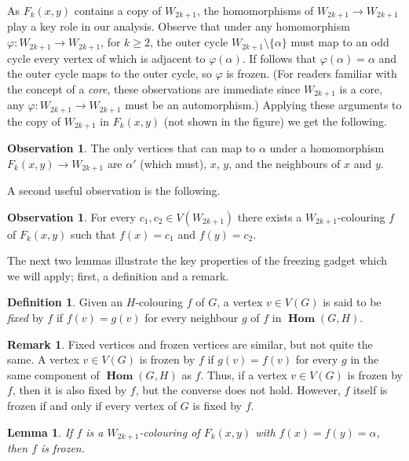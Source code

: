 \documentclass[11 pt]{amsart}
\newtheorem{lem}[equation]{Lemma}
\theoremstyle{definition}
\newtheorem{defn}[equation]{Definition}
\newtheorem{obs}[equation]{Observation}
\newtheorem{rem}[equation]{Remark}
\theoremstyle{case}
\numberwithin{equation}{section}
\newcommand{\bHom}{\operatorname{\mathbf{Hom}}}
\begin{document}
As $F_k(x,y)$ contains a copy of $W_{2k+1}$, the homomorphisms of $W_{2k+1} \to W_{2k+1}$ play a key role in our analysis.  Observe that under any homomorphism $\varphi: W_{2k+1} \to W_{2k+1}$, for $k \geq 2$, the outer cycle $W_{2k+1} \setminus \{ \alpha \}$ must map to an odd cycle every vertex of which is adjacent to $\varphi(\alpha)$.  If follows that $\varphi(\alpha) = \alpha$ and the outer cycle maps to the outer cycle, so $\varphi$ is frozen.  (For readers familiar with the concept of a \emph{core}, these observations are immediate since $W_{2k+1}$ is a core, any $\varphi: W_{2k+1} \to W_{2k+1}$ must be an automorphism.) Applying these arguments to the copy of $W_{2k+1}$ in $F_k(x,y)$ (not shown in the figure) we get the following.

\begin{obs}
\label{toalpha}
The only vertices that can map to $\alpha$ under a homomorphism $F_k(x,y) \to W_{2k+1}$ are $\alpha'$ (which must), $x$, $y$, and the neighbours of $x$ and $y$.  
\end{obs}

A second useful observation is the following.

\begin{obs}
\label{anyPair}
For every $c_1,c_2\in V(W_{2k+1})$ there exists a $W_{2k+1}$-colouring $f$ of $F_k(x,y)$ such that $f(x)=c_1$ and $f(y)=c_2$. 
\end{obs}

The next two lemmas illustrate the key properties of the freezing gadget which we will apply; first, a definition and a remark. 

\begin{defn}
Given an $H$-colouring $f$ of $G$, a vertex $v\in V(G)$ is said to be \emph{fixed} by $f$ if $f(v) = g(v)$ for every neighbour $g$ of $f$ in $\bHom(G,H)$.
\end{defn}

\begin{rem}
Fixed vertices and frozen vertices are similar, but not quite the same. A vertex $v \in V(G)$ is frozen by $f$ if $g(v) = f(v)$ for every $g$ in the same component of $\bHom(G,H)$ as $f$. Thus, if a vertex $v\in V(G)$ is frozen by $f$, then it is also fixed by $f$, but the converse does not hold. However, $f$ itself is frozen if and only if every vertex of $G$ is fixed by $f$.
\end{rem}

\begin{lem}
\label{alphaFrozen}
If $f$ is a $W_{2k+1}$-colouring of $F_k(x,y)$ with $f(x)=f(y)=\alpha$, then $f$ is frozen. 
\end{lem}
\end{document}

